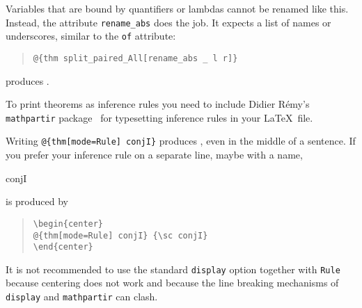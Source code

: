 \begin{isabellebody}
\begin{isamarkuptext}
\begin{quote}
\end{quote}
Variables that are bound by quantifiers or lambdas cannot be renamed
like this. Instead, the attribute \texttt{rename\_abs} does the
job. It expects a list of names or underscores, similar to the
\texttt{of} attribute:
\begin{quote}
\verb!@!\verb!{thm split_paired_All[rename_abs _ l r]}!
\end{quote}
produces .%
\end{isamarkuptext}%
\isamarkuptrue%
%
\isamarkuptrue%
%
\begin{isamarkuptext}%
To print theorems as inference rules you need to include Didier
R\'emy's \texttt{mathpartir} package~\cite{mathpartir}
for typesetting inference rules in your \LaTeX\ file.

Writing \verb!@!\verb!{thm[mode=Rule] conjI}! produces
, even in the middle of a sentence.
If you prefer your inference rule on a separate line, maybe with a name,
\begin{center}
 {\sc conjI}
\end{center}
is produced by
\begin{quote}
\verb!\begin{center}!\\
\verb!@!\verb!{thm[mode=Rule] conjI} {\sc conjI}!\\
\verb!\end{center}!
\end{quote}
It is not recommended to use the standard \texttt{display} option
together with \texttt{Rule} because centering does not work and because
the line breaking mechanisms of \texttt{display} and \texttt{mathpartir} can
clash.


\end{isamarkuptext}
\end{isabellebody}
